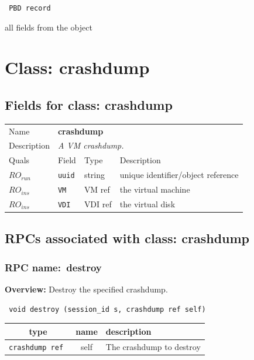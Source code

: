 \vspace{0.3cm}

{\tt 
PBD record
}


all fields from the object
\vspace{0.3cm}
\vspace{0.3cm}
\vspace{0.3cm}

\vspace{1cm}
\newpage
\section{Class: crashdump}
\subsection{Fields for class: crashdump}
\begin{longtable}{|lllp{}|}
\hline
\multicolumn{1}{|l}{Name} & \multicolumn{3}{l|}{\bf crashdump} \\
\multicolumn{1}{|l}{Description} & \multicolumn{3}{l|}{\parbox{11cm}{\em A
VM crashdump.}} \\
\hline
Quals & Field & Type & Description \\
\hline
$\mathit{RO}_\mathit{run}$ &  {\tt uuid} & string & unique identifier/object reference \\
$\mathit{RO}_\mathit{ins}$ &  {\tt VM} & VM ref & the virtual machine \\
$\mathit{RO}_\mathit{ins}$ &  {\tt VDI} & VDI ref & the virtual disk \\
\hline
\end{longtable}
\subsection{RPCs associated with class: crashdump}
\subsubsection{RPC name:~destroy}

{\bf Overview:} 
Destroy the specified crashdump.

\begin{verbatim} void destroy (session_id s, crashdump ref self)\end{verbatim}



 
\vspace{0.3cm}
\begin{tabular}{|c|c|p{7cm}|}
 \hline
{\bf type} & {\bf name} & {\bf description} \\ \hline
{\tt crashdump ref } & self & The crashdump to destroy \\ \hline 

\end{tabular}

